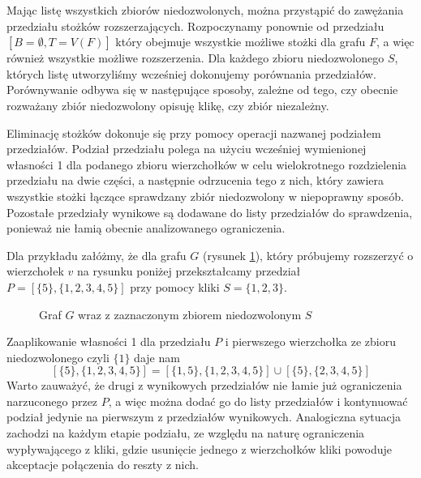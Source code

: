 Mając listę wszystkich zbiorów niedozwolonych, można przystąpić do zawężania przedziału stożków rozszerzających. Rozpoczynamy ponownie od przedziału $[B = \emptyset, T = V(F) ]$ który obejmuje wszystkie możliwe stożki dla grafu $F$, a więc również wszystkie możliwe rozszerzenia. Dla każdego zbioru niedozwolonego $S$, których listę utworzyliśmy wcześniej dokonujemy porównania przedziałów. Porównywanie odbywa się w następujące sposoby, zależne od tego, czy obecnie rozważany zbiór niedozwolony opisuję klikę, czy zbiór niezależny.

Eliminację stożków dokonuje się przy pomocy operacji nazwanej podziałem przedziałów. Podział przedziału polega na użyciu wcześniej wymienionej własności 1 dla podanego zbioru wierzchołków w celu wielokrotnego rozdzielenia przedziału na dwie części, a następnie odrzucenia tego z nich, który zawiera wszystkie stożki łączące sprawdzany zbiór niedozwolony w niepoprawny sposób. Pozostałe przedziały wynikowe są dodawane do listy przedziałów do sprawdzenia, ponieważ nie łamią obecnie analizowanego ograniczenia. 

Dla przykładu załóżmy, że dla grafu $G$ (rysunek \ref{SKlika}), który próbujemy rozszerzyć o wierzchołek $v$ na rysunku poniżej przekształcamy przedział $P =[\{5\},\{1,2,3,4,5\}]$ przy pomocy kliki $S = \{1,2,3\}$.
\begin{figure}[H]
  \centering
    \caption{Graf $G$ wraz z zaznaczonym zbiorem niedozwolonym $S$}
    \label{SKlika}
 \end{figure}
 

 Zaaplikowanie własności 1 dla przedziału $P$ i pierwszego wierzchołka ze zbioru niedozwolonego czyli $\{1\}$ daje nam  
$$[\{5\},\{1,2,3,4,5\}] = [\{1,5\},\{1,2,3,4,5\}] \cup [\{5\},\{2,3,4,5\}]$$ 
Warto zauważyć, że drugi z wynikowych przedziałów nie łamie już ograniczenia narzuconego przez $P$, a więc można dodać go do listy przedziałów i kontynuować podział jedynie na pierwszym z przedziałów wynikowych. Analogiczna sytuacja zachodzi na każdym etapie podziału, ze względu na naturę ograniczenia wypływającego z kliki, gdzie usunięcie jednego z wierzchołków kliki powoduje akceptacje połączenia do reszty z nich. 


